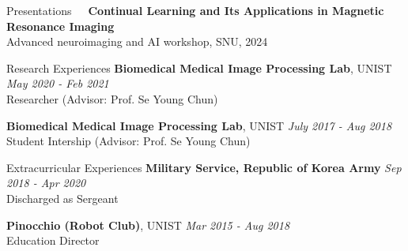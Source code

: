 \documentclass{resume} %
\begin{document}
\begin{rSection}{Presentations}
\textbullet~\,\, \textbf{Continual Learning and Its Applications in Magnetic Resonance Imaging}
\\ \hspace*{1.5em}Advanced neuroimaging and AI workshop, SNU, 2024 \\
\end{rSection}













\newpage

\begin{rSection}{Research Experiences}
{\bf Biomedical Medical Image Processing Lab}{, UNIST} \hfill {\it May 2020 - Feb 2021}
\\{Researcher (Advisor: Prof. Se Young Chun)} 

{\bf Biomedical Medical Image Processing Lab}{, UNIST}  \hfill {\it July 2017 - Aug 2018}
\\{Student Intership (Advisor: Prof. Se Young Chun)} \\
\end{rSection}


\begin{rSection}{Extracurricular Experiences}
{\bf Military Service, Republic of Korea Army} \hfill {\it Sep 2018 - Apr 2020}
\\{Discharged as Sergeant}

{\bf Pinocchio (Robot Club)}{, UNIST} \hfill {\it Mar 2015 - Aug 2018}
\\{Education Director} 
\end{rSection}
\end{document}

